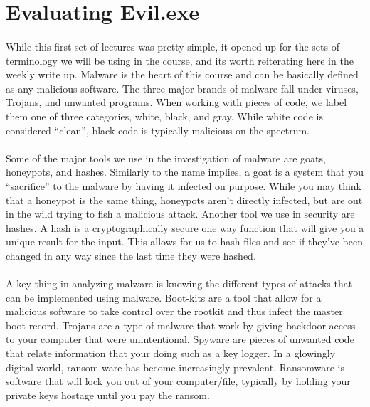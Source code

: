 \documentclass[12pt]{article}
\begin{document}
\maketitle

\section{Evaluating Evil.exe}
\paragraph{}While this first set of lectures was pretty simple, it opened up for the sets of terminology we will be using in the course, and its worth reiterating here in the weekly write up.
Malware is the heart of this course and can be basically defined as any malicious software. 
The three major brands of malware fall under viruses, Trojans, and unwanted programs. 
When working with pieces of code, we label them one of three categories, white, black, and gray. 
While white code is considered ``clean'', black code is typically malicious on the spectrum. 

\paragraph{}Some of the major tools we use in the investigation of malware are goats, honeypots, and hashes.
Similarly to the name implies, a goat is a system that you ``sacrifice'' to the malware by having it infected on purpose. 
While you may think that a honeypot is the same thing, honeypots aren't directly infected, but are out in the wild trying to fish a malicious attack. 
Another tool we use in security are hashes.
A hash is a cryptographically secure one way function that will give you a unique result for the input. 
This allows for us to hash files and see if they've been changed in any way since the last time they were hashed. 

\paragraph{}A key thing in analyzing malware is knowing the different types of attacks that can be implemented using malware.
Boot-kits are a tool that allow for a malicious software to take control over the rootkit and thus infect the master boot record.
Trojans are a type of malware that work by giving backdoor access to your computer that were unintentional. 
Spyware are pieces of unwanted code that relate information that your doing such as a key logger. 
In a glowingly digital world, ransom-ware has become increasingly prevalent. 
Ransomware is software that will lock you out of your computer/file, typically by holding your private keys hostage until you pay the ransom. 
\end{document}
